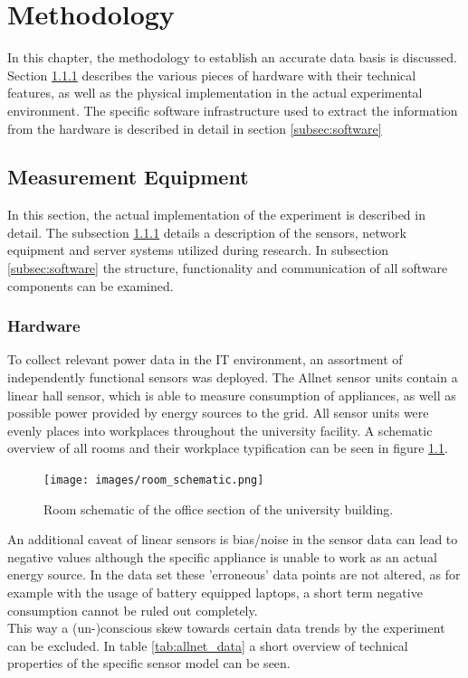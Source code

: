 \chapter{Methodology}\label{chap:methods}
In this chapter, the methodology to establish an accurate data basis is discussed.  Section \ref{subsec:hardware} describes the various pieces of hardware with their technical features, as well as the physical implementation in the actual experimental environment. The specific software infrastructure used to extract the information from the hardware is described in detail in section \ref{subsec:software}


\section{Measurement Equipment}
In this section, the actual implementation of the experiment is described in detail. The subsection \ref{subsec:hardware} details a description of the sensors, network equipment and server systems utilized during research. In subsection \ref{subsec:software} the structure, functionality and communication of all software components can be examined.
\subsection{Hardware}\label{subsec:hardware}
To collect relevant power data in the IT environment, an assortment of independently functional sensors was deployed.
The Allnet sensor units contain a linear hall sensor, which is able to measure consumption of appliances, as well as possible power provided by energy sources to the grid. All sensor units were evenly places into workplaces throughout the university facility. A schematic overview of all rooms and their workplace typification can be seen in figure \ref{fig:schema}.
\begin{figure}[h]
	\centering
	\texttt{[image: images/room\_schematic.png]}
	\caption{Room schematic of the office section of the university building.}
	\label{fig:schema}
\end{figure} 
An additional caveat of linear sensors is bias/noise in the sensor data can lead to negative values although the specific appliance is unable to work as an actual energy source. In the data set these 'erroneous' data points are not altered, as for example with the usage of battery equipped laptops, a short term negative consumption cannot be ruled out completely.\\
This way a (un-)conscious skew towards certain data trends by the experiment can be excluded. In table \ref{tab:allnet_data} a short overview of technical properties of the specific sensor model can be seen.


